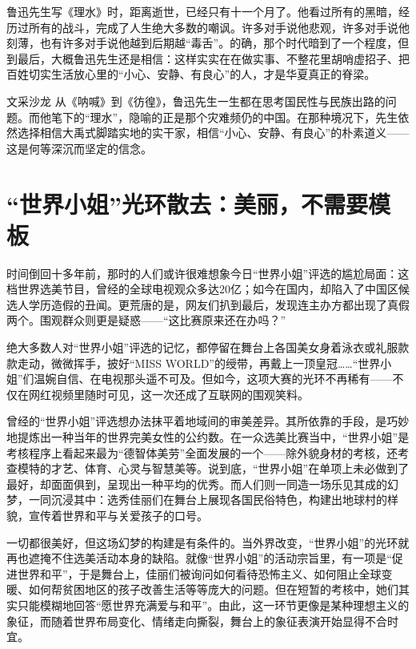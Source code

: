 鲁迅先生写《理水》时，距离逝世，已经只有十一个月了。他看过所有的黑暗，经历过所有的战斗，完成了人生绝大多数的嘲讽。许多对手说他悲观，许多对手说他刻薄，也有许多对手说他越到后期越“毒舌”。的确，那个时代暗到了一个程度，但到最后，大概鲁迅先生还是相信：这样实实在在做实事、不整花里胡哨虚招子、把百姓切实生活放心里的“小心、安静、有良心”的人，才是华夏真正的脊梁。

\begin{quoteBox}{文采沙龙}
从《呐喊》到《彷徨》，鲁迅先生一生都在思考国民性与民族出路的问题。而他笔下的“理水”，隐喻的正是那个灾难频仍的中国。在那种境况下，先生依然选择相信大禹式脚踏实地的实干家，相信“小心、安静、有良心”的朴素道义——这是何等深沉而坚定的信念。
\end{quoteBox}

\clearpage
\section*{“世界小姐”光环散去：美丽，不需要模板}

时间倒回十多年前，那时的人们或许很难想象今日“世界小姐”评选的尴尬局面：这档世界选美节目，曾经的全球电视观众多达20亿；如今在国内，却陷入了中国区候选人学历造假的丑闻。更荒唐的是，网友们扒到最后，发现连主办方都出现了真假两个。围观群众则更是疑惑——“这比赛原来还在办吗？”

绝大多数人对“世界小姐”评选的记忆，都停留在舞台上各国美女身着泳衣或礼服款款走动，微微挥手，披好“MISS WORLD”的绶带，再戴上一顶皇冠……“世界小姐”们温婉自信、在电视那头遥不可及。但如今，这项大赛的光环不再稀有——不仅在网红视频里随时可见，这一次还成了互联网的围观笑料。

曾经的“世界小姐”评选想办法抹平着地域间的审美差异。其所依靠的手段，是巧妙地提炼出一种当年的世界完美女性的公约数。在一众选美比赛当中，“世界小姐”是考核程序上看起来最为“德智体美劳”全面发展的一个——除外貌身材的考核，还考查模特的才艺、体育、心灵与智慧美等。说到底，“世界小姐”在单项上未必做到了最好，却面面俱到，呈现出一种平均的优秀。而人们则一同造一场乐见其成的幻梦，一同沉浸其中：选秀佳丽们在舞台上展现各国民俗特色，构建出地球村的样貌，宣传着世界和平与关爱孩子的口号。

一切都很美好，但这场幻梦的构建是有条件的。当外界改变，“世界小姐”的光环就再也遮掩不住选美活动本身的缺陷。就像“世界小姐”的活动宗旨里，有一项是“促进世界和平”，于是舞台上，佳丽们被询问如何看待恐怖主义、如何阻止全球变暖、如何帮贫困地区的孩子改善生活等等庞大的问题。但在短暂的考核中，她们其实只能模糊地回答“愿世界充满爱与和平”。由此，这一环节更像是某种理想主义的象征，而随着世界布局变化、情绪走向撕裂，舞台上的象征表演开始显得不合时宜。

